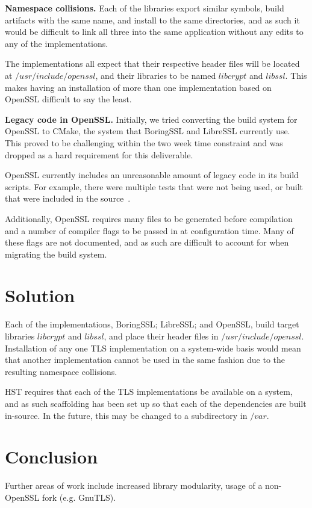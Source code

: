 \documentclass{acm_proc_article-sp}
\begin{document}
\textbf{Namespace collisions.} Each of the libraries export similar symbols,
build artifacts with the same name, and install to the same directories, and as
such it would be difficult to link all three into the same application without
any edits to any of the implementations.

The implementations all expect that their respective header files will be
located at $/usr/include/openssl$, and their libraries to be named $libcrypt$
and $libssl$. This makes having an installation of more than one implementation
based on OpenSSL difficult to say the least.

\textbf{Legacy code in OpenSSL.} Initially, we tried converting the build system
for OpenSSL to CMake, the system that BoringSSL and LibreSSL currently use. This
proved to be challenging within the two week time constraint and was dropped as
a hard requirement for this deliverable.

OpenSSL currently includes an unreasonable amount of legacy code in its build
scripts. For example, there were multiple tests that were not being used, or
built that were included in the source~\cite{issue}.

Additionally, OpenSSL requires many files to be generated before compilation and
a number of compiler flags to be passed in at configuration time. Many of these
flags are not documented, and as such are difficult to account for when
migrating the build system.

\section{Solution}
Each of the implementations, BoringSSL; LibreSSL; and OpenSSL, build target
libraries $libcrypt$ and $libssl$, and place their header files in
$/usr/include/openssl$. Installation of any one TLS implementation on a system-wide
basis would mean that another implementation cannot be used in the same fashion
due to the resulting namespace collisions.

HST requires that each of the TLS implementations be available on a system, and
as such scaffolding has been set up so that each of the dependencies are built
in-source. In the future, this may be changed to a subdirectory in $/var$.

\section{Conclusion}

Further areas of work include increased library modularity, usage of a
non-OpenSSL fork (e.g. GnuTLS).
\end{document}
